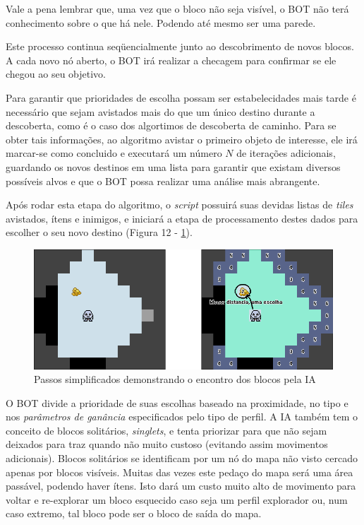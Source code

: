 Vale a pena lembrar que, uma vez que o bloco não seja visível, o BOT não terá conhecimento sobre o que há nele. Podendo até mesmo ser uma parede. 

Este processo continua seqüencialmente junto ao descobrimento de novos blocos. A cada novo nó aberto, o BOT irá realizar a checagem para confirmar se ele chegou ao seu objetivo. 

Para garantir que prioridades de escolha possam ser estabelecidades mais tarde é necessário que sejam avistados mais do que um único destino durante a descoberta, como é o caso dos algortimos de descoberta de caminho. Para se obter tais informações, ao algoritmo avistar o primeiro objeto de interesse, ele irá marcar-se como concluido e executará um número $N$ de iterações adicionais, guardando os novos destinos em uma lista para garantir que existam diversos possíveis alvos e que o BOT possa realizar uma análise mais abrangente. 

Após rodar esta etapa do algoritmo, o \textit{script} possuirá suas devidas listas de \textit{tiles} avistados, ítens e inimigos, e iniciará a etapa de processamento destes dados para escolher o seu novo destino (Figura 12 - \ref{fig12}). 

\begin{figure}[h]
	\centering
	\label{fig12}
		\includegraphics[keepaspectratio=true,scale=0.5]{figuras/fig12-bot.png}
	\caption{Passos simplificados demonstrando o encontro dos blocos pela IA}
\end{figure}

O BOT divide a prioridade de suas escolhas baseado na proximidade, no tipo e nos \textit{parâmetros de ganância} especificados pelo tipo de perfil. 
A IA também tem o conceito de blocos solitários, \textit{singlets}, e tenta priorizar para que não sejam deixados para traz quando não muito custoso (evitando assim movimentos adicionais). Blocos solitários se identificam por um nó do mapa não visto cercado apenas por blocos visíveis. Muitas das vezes este pedaço do mapa será uma área passável, podendo haver ítens. Isto dará um custo muito alto de movimento para voltar e re-explorar um bloco esquecido caso seja um perfil explorador ou, num caso extremo, tal bloco pode ser o bloco de saída do mapa. 

